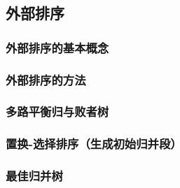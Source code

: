 \documentclass[12pt, a4paper, oneside]{ctexart}
\begin{document}
\subsection{外部排序}

\subsubsection{外部排序的基本概念}

\subsubsection{外部排序的方法}

\subsubsection{多路平衡归与败者树}

\subsubsection{置换-选择排序（生成初始归并段）}

\subsubsection{最佳归并树}
\end{document}
